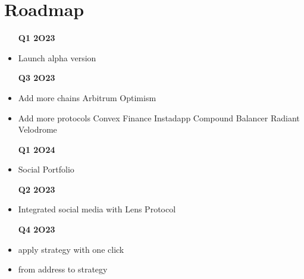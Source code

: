 \documentclass{article}
\begin{document}
\section{Roadmap}
\label{sec:roadmap}
\begin{multicols*}{2}
    \begin{itemize}
        \item [\textbf{Q1 2O23}]
        \item Launch alpha version
    \end{itemize}
    \begin{itemize}
        \item [\textbf{Q3 2O23}]
        \item Add more chains
        \subitem Arbitrum 
        \subitem Optimism
        \item Add more protocols
        \subitem Convex Finance
        \subitem Instadapp
        \subitem Compound
        \subitem Balancer
        \subitem Radiant
        \subitem Velodrome
    \end{itemize}
    \begin{itemize}
        \item [\textbf{Q1 2O24}]
        \item Social Portfolio
    \end{itemize}
    \vfill\null
    \columnbreak
    \begin{itemize}
        \item [\textbf{Q2 2O23}]
        \item Integrated social media with Lens Protocol
    \end{itemize}
    \begin{itemize}
        \item [\textbf{Q4 2O23}]
        \item apply strategy with one click
        \item from address to strategy
    \end{itemize}
\end{multicols*}
\end{document}
